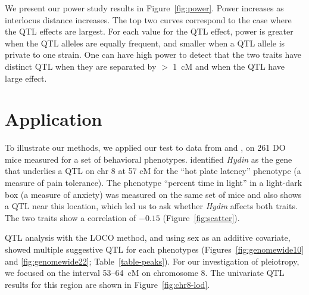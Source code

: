 \documentclass[12pt,twoside, lineno]{gsajnl}
\begin{document}
We present our power study results in Figure~\ref{fig:power}.
Power increases as interlocus distance increases. The top two curves
correspond to the case where the QTL effects are largest. For each value
for the QTL effect, power is greater when the QTL alleles are equally
frequent, and smaller when a QTL allele is private to one strain. One
can have high power to detect that the two traits have distinct QTL
when they are separated by $>$ 1~cM and when the QTL have large effect.


\section{Application}
\label{sec:app}

To illustrate our methods, we applied our test to data from
\citet{logan2013high} and \citet{recla2014precise}, on 261 DO mice
measured for a set of behavioral phenotypes.
\citet{recla2014precise} identified \textit{Hydin} as the gene that
underlies a QTL on chr 8 at 57 cM for the ``hot plate latency''
phenotype (a measure of pain tolerance). The phenotype ``percent time in light''
in a light-dark box (a measure of anxiety) was
measured on the same set of mice \citep{logan2013high} and also shows a QTL near
this location, which led us to ask whether \textit{Hydin} affects both traits.
The two traits show a correlation of $-0.15$ (Figure~\ref{fig:scatter}).

QTL analysis with the LOCO method, and using sex as an additive
covariate, showed multiple suggestive QTL for each
phenotypes (Figures~\ref{fig:genomewide10}
and \ref{fig:genomewide22}; Table~\ref{table-peaks}). For our investigation of
pleiotropy, we focused on the interval 53--64~cM on chromosome 8.
The univariate QTL results for this region are shown in
Figure~\ref{fig:chr8-lod}.
\end{document}
